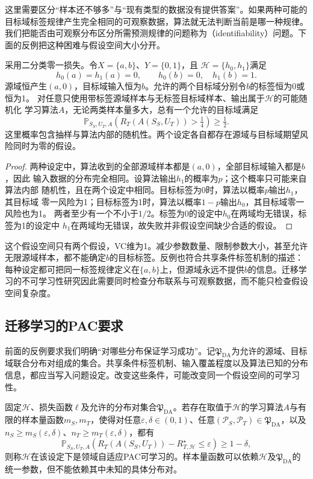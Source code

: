 这里需要区分“样本还不够多”与“现有类型的数据没有提供答案”。如果两种可能的目标域标签规律产生完全相同的可观察数据，算法就无法判断当前是哪一种规律。我们把能否由可观察分布区分所需预测规律的问题称为（identifiability）问题。下面的反例把这种困难与假设空间大小分开。

\begin{theorem}[缺少覆盖时的不可学习性]
\label{thm:transfer-nonidentifiability}
采用二分类零一损失。令$X=\{a,b\}$、$Y=\{0,1\}$，且
$\mathcal H=\{h_0,h_1\}$满足
\[
 h_0(a)=h_1(a)=0,\qquad h_0(b)=0,\quad h_1(b)=1.
\]
源域恒产生$(a,0)$，目标域输入恒为$b$。允许的两个目标域分别令$b$的标签恒为0或恒为1。
对任意只使用带标签源域样本与无标签目标域样本、输出属于$\mathcal H$的可能随机化
学习算法$A$，无论两类样本量多大，总有一个允许的目标域满足
\[
 \mathbb P_{S_S,U_T,A}\!\left(
 R_T(A(S_S,U_T))>\tfrac14
 \right)\geq\tfrac12.
\]
这里概率包含抽样与算法内部的随机性。两个设定各自都存在源域与目标域期望风险同时为零的假设。
\end{theorem}
\begin{proof}
两种设定中，算法收到的全部源域样本都是$(a,0)$，全部目标域输入都是$b$，因此
输入数据的分布完全相同。设算法输出$h_1$的概率为$p$；这个概率只可能来自算法内部
随机性，且在两个设定中相同。目标标签为0时，算法以概率$p$输出$h_1$，其目标域
零一风险为1；目标标签为1时，算法以概率$1-p$输出$h_0$，其目标域零一风险也为1。
两者至少有一个不小于$1/2$。标签为0的设定中$h_0$在两域均无错误，标签为1的设定中
$h_1$在两域均无错误，故失败并非假设空间缺少合适的假设。
\end{proof}

这个假设空间只有两个假设，VC维为1。减少参数数量、限制参数大小，甚至允许无限源域样本，都不能确定$b$的目标标签。反例也符合共享条件标签机制的描述：每种设定都可把同一标签规律定义在$\{a,b\}$上，但源域永远不提供$b$的信息。迁移学习的不可学习性研究因此需要同时检查分布联系与可观察数据，而不能只检查假设空间复杂度。

\subsection{迁移学习的PAC要求}
\label{sec:transfer-pac-setting}

前面的反例要求我们明确“对哪些分布保证学习成功”。记$\mathfrak P_{\mathrm{DA}}$为允许的源域、目标域联合分布对组成的集合。共享条件标签机制、输入覆盖程度以及算法已知的分布信息，都应当写入问题设定。改变这些条件，可能改变同一个假设空间的可学习性。

\begin{definition}[相对于分布族的领域自适应PAC可学习性]
\label{def:adaptation-pac-learnability}
固定$\mathcal H$、损失函数$\ell$及允许的分布对集合$\mathfrak P_{\mathrm{DA}}$。若存在取值于$\mathcal H$的学习算法$A$与有限的样本量函数$m_S,m_T$，使得对任意$\varepsilon,\delta\in(0,1)$、任意$(\mathcal P_S,\mathcal P_T)\in\mathfrak P_{\mathrm{DA}}$，以及$n_S\geq m_S(\varepsilon,\delta)$、$n_T\geq m_T(\varepsilon,\delta)$，都有
\[
 \mathbb P_{S_S,U_T,A}\!\left(
 R_T(A(S_S,U_T))-R_{T,\mathcal H}^{\star}\leq\varepsilon
 \right)\geq1-\delta,
\]
则称$\mathcal H$在该设定下是领域自适应PAC可学习的。样本量函数可以依赖$\mathcal H$及$\mathfrak P_{\mathrm{DA}}$的统一参数，但不能依赖其中未知的具体分布对。
\end{definition}

